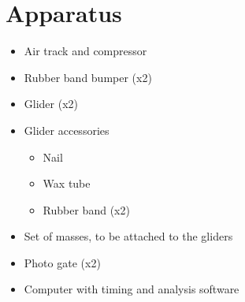 \section*{Apparatus}

\begin{itemize}
    \item Air track and compressor
    \item Rubber band bumper (x2)
    \item Glider (x2)
    \item Glider accessories
    \begin{itemize}
        \item Nail
        \item Wax tube
        \item Rubber band (x2)
    \end{itemize}
    \item Set of masses, to be attached to the gliders
    \item Photo gate (x2)
    \item Computer with timing and analysis software
\end{itemize}
